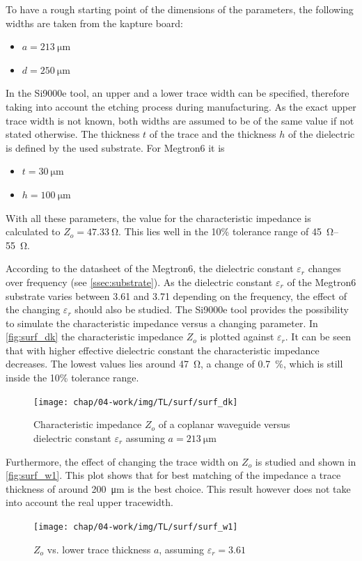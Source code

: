 To have a rough starting point of the dimensions of the parameters, the following widths are taken from the \gls{kapture} board:
\begin{itemize}
	\item $a = \SI{213}{\micro \meter}$
	\item $d = \SI{250}{\micro \meter}$
\end{itemize}
In the Si9000e tool, an upper and a lower trace width can be specified, therefore taking into account the etching process during manufacturing.
As the exact upper trace width is not known, both widths are assumed to be of the same value if not stated otherwise.
The thickness $t$ of the trace and the thickness $h$ of the dielectric is defined by the used substrate.
For Megtron6 it is 
\begin{itemize}
	\item $t = \SI{30}{\micro \meter}$
	\item $h = \SI{100}{\micro \meter}$
\end{itemize}
With all these parameters, the value for the characteristic impedance is calculated to $Z_o = \SI{47.33}{\ohm}$.
This lies well in the 10\% tolerance range of \SIrange{45}{55}{\ohm}. 

According to the datasheet of the Megtron6, the dielectric constant $\varepsilon_r$ changes over frequency (see \autoref{ssec:substrate}).
As the dielectric constant $\varepsilon_r$ of the Megtron6 substrate varies between 3.61 and 3.71 depending on the frequency, the effect of the changing $\varepsilon_r$ should also be studied. 
The Si9000e tool provides the possibility to simulate the characteristic impedance versus a changing parameter.
In \autoref{fig:surf_dk} the characteristic impedance $Z_o$ is plotted against $\varepsilon_r$.
It can be seen that with higher effective dielectric constant the characteristic impedance decreases.
The lowest values lies around \SI{47}{\ohm}, a change of \SI{0.7}{\percent}, which is still inside the 10\% tolerance range.
\begin{figure}[tbh]
	\centering
	\texttt{[image: chap/04-work/img/TL/surf/surf\_dk]}
	\caption[CWG, $Z_o$ vs $\varepsilon_r$]{Characteristic impedance $Z_o$ of a coplanar waveguide versus dielectric constant $\varepsilon_r$ assuming $a = \SI{213}{\micro \meter}$}
	\label{fig:surf_dk}
\end{figure}

Furthermore, the effect of changing the trace width on $Z_o$ is studied and shown in \autoref{fig:surf_w1}.
This plot shows that for best matching of the impedance a trace thickness of around \SI{200}{\micro \meter} is the best choice.
This result however does not take into account the real upper tracewidth.
\begin{figure}[tbh]
	\centering
	\texttt{[image: chap/04-work/img/TL/surf/surf\_w1]}
	\caption[CWG, $Z_o$ vs. $a$]{$Z_o$ vs. lower trace thickness $a$, assuming $\varepsilon_r = 3.61$}
	\label{fig:surf_w1}
\end{figure}

